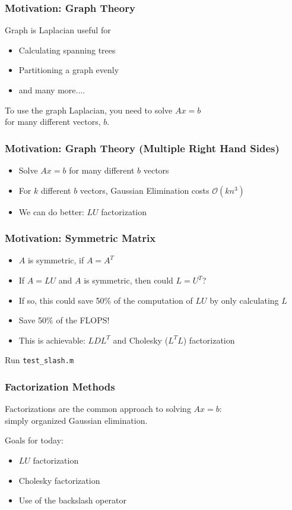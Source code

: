\documentclass[10pt]{beamer}
\newcommand{\mO}{{\mathcal{O}}}
\begin{document}
\begin{frame}
\frametitle{Motivation: Graph Theory}
Graph is Laplacian useful for
\begin{itemize}
    \item Calculating spanning trees
    \item Partitioning a graph evenly
    \item and many more....
\end{itemize}
\bigskip
To use the graph Laplacian, you need to solve $A x = b$\\for many different vectors, $b$.
\end{frame}
\begin{frame}
\frametitle{Motivation: Graph Theory (Multiple Right Hand Sides)}
\begin{itemize}
    \item Solve $A x = b$ for many different $b$ vectors
    \item For $k$ different $b$ vectors, Gaussian Elimination costs $\mO(k n^3)$
    \item We can do better:  $LU$ factorization
\end{itemize}
\end{frame}
\begin{frame}
\frametitle{Motivation: Symmetric Matrix} 
\begin{itemize}
    \item $A$ is symmetric, if $A = A^T$
    \item If $A = L U$ and $A$ is symmetric, then could $L = U^T$?
    \item If so, this could save 50\% of the computation of $LU$ by only calculating $L$
    \item Save 50\% of the FLOPS!
    \item This is achievable: $L D L^T$ and Cholesky ($L^T L$) factorization
\end{itemize}
\begin{alertblock}{}
Run \texttt{test\_slash.m}
\end{alertblock}
\end{frame}
\begin{frame}
\frametitle{Factorization Methods}
Factorizations are the common approach to solving $Ax=b$:\\ simply organized
Gaussian elimination.
\bigskip

Goals for today:
\begin{itemize}
    \item   $LU$ factorization
    \item   Cholesky factorization
    \item   Use of the backslash operator
\end{itemize}
\end{frame}
\end{document}
